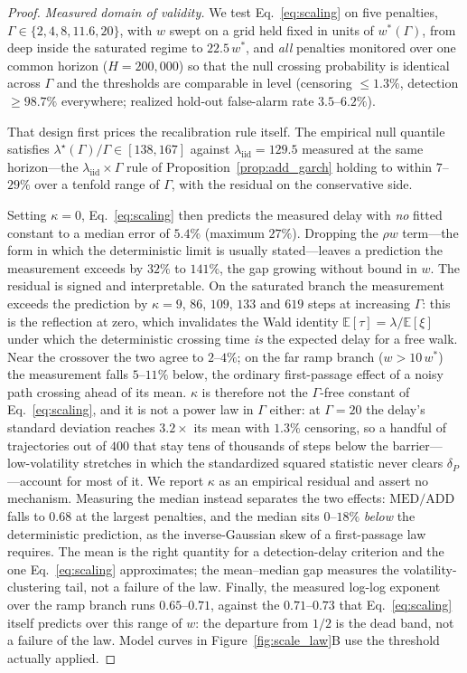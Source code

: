 \documentclass[sigconf,anonymous,review]{acmart}
\theoremstyle{acmdefinition}
\begin{document}
\begin{proof}
    \emph{Measured domain of validity.}
    We test Eq.~\eqref{eq:scaling} on five penalties, $\Gamma \in \{2, 4, 8, 11.6, 20\}$, with $w$ swept on a grid held fixed in units of $w^*(\Gamma)$, from deep inside the saturated regime to $22.5\,w^*$, and \emph{all} penalties monitored over one common horizon ($H = 200{,}000$) so that the null crossing probability is identical across $\Gamma$ and the thresholds are comparable in level (censoring $\le 1.3\%$, detection $\ge 98.7\%$ everywhere; realized hold-out false-alarm rate $3.5$--$6.2\%$).

    That design first prices the recalibration rule itself. The empirical null quantile satisfies $\lambda^{\star}(\Gamma)/\Gamma \in [138, 167]$ against $\lambda_{\mathrm{iid}} = 129.5$ measured at the same horizon---the $\lambda_{\mathrm{iid}} \times \Gamma$ rule of Proposition~\ref{prop:add_garch} holding to within $7$--$29\%$ over a tenfold range of $\Gamma$, with the residual on the conservative side.

    Setting $\kappa = 0$, Eq.~\eqref{eq:scaling} then predicts the measured delay with \emph{no} fitted constant to a median error of $5.4\%$ (maximum $27\%$). Dropping the $\rho w$ term---the form in which the deterministic limit is usually stated---leaves a prediction the measurement exceeds by $32\%$ to $141\%$, the gap growing without bound in $w$.
    The residual is signed and interpretable. On the saturated branch the measurement exceeds the prediction by $\kappa = 9$, $86$, $109$, $133$ and $619$ steps at increasing $\Gamma$: this is the reflection at zero, which invalidates the Wald identity $\mathbb{E}[\tau] = \lambda/\mathbb{E}[\xi]$ under which the deterministic crossing time \emph{is} the expected delay for a free walk. Near the crossover the two agree to $2$--$4\%$; on the far ramp branch ($w > 10\,w^*$) the measurement falls $5$--$11\%$ below, the ordinary first-passage effect of a noisy path crossing ahead of its mean.
    $\kappa$ is therefore not the $\Gamma$-free constant of Eq.~\eqref{eq:scaling}, and it is not a power law in $\Gamma$ either: at $\Gamma = 20$ the delay's standard deviation reaches $3.2\times$ its mean with $1.3\%$ censoring, so a handful of trajectories out of $400$ that stay tens of thousands of steps below the barrier---low-volatility stretches in which the standardized squared statistic never clears $\delta_P$---account for most of it. We report $\kappa$ as an empirical residual and assert no mechanism.
    Measuring the median instead separates the two effects: $\mathrm{MED}/\mathrm{ADD}$ falls to $0.68$ at the largest penalties, and the median sits $0$--$18\%$ \emph{below} the deterministic prediction, as the inverse-Gaussian skew of a first-passage law requires. The mean is the right quantity for a detection-delay criterion and the one Eq.~\eqref{eq:scaling} approximates; the mean--median gap measures the volatility-clustering tail, not a failure of the law.
    Finally, the measured log-log exponent over the ramp branch runs $0.65$--$0.71$, against the $0.71$--$0.73$ that Eq.~\eqref{eq:scaling} itself predicts over this range of $w$: the departure from $1/2$ is the dead band, not a failure of the law. Model curves in Figure~\ref{fig:scale_law}B use the threshold actually applied.


\end{proof}
\end{document}
